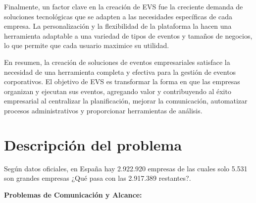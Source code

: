 Finalmente, un factor clave en la creación de EVS fue la creciente demanda de soluciones tecnológicas que se adapten a las 
necesidades específicas de cada empresa. La personalización y la flexibilidad de la plataforma la hacen una herramienta adaptable a 
una variedad de tipos de eventos y tamaños de negocios, lo que permite que cada usuario maximice su utilidad.

En resumen, la creación de soluciones de eventos empresariales satisface la necesidad de una herramienta completa y efectiva para la 
gestión de eventos corporativos. El objetivo de EVS es transformar la forma en que las empresas organizan y ejecutan sus eventos, agregando valor y 
contribuyendo al éxito empresarial al centralizar la planificación, mejorar la comunicación, automatizar procesos administrativos y proporcionar 
herramientas de análisis.

\section{Descripción del problema}
Según datos oficiales, en España hay 2.922.920 empresas de las cuales solo  5.531 son grandes empresas \cite{pymes} ¿Qué pasa con las 2.917.389 restantes?.

\textbf{Problemas de Comunicación y Alcance:}

